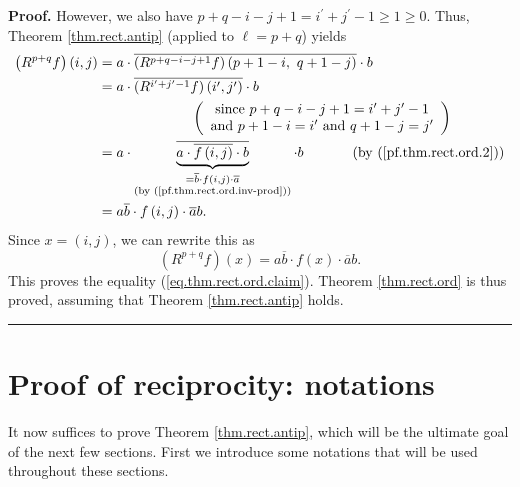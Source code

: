 \documentclass[numbers=enddot,12pt,final,onecolumn,notitlepage]{scrartcl}%
\theoremstyle{definition}
\newenvironment{verlong}{}{}
\newenvironment{proof}[1][Proof]{\noindent\textbf{#1.} }{\ \rule{0.5em}{0.5em}}
\begin{document}
\begin{verlong}
\begin{proof}
However, we also have $p+q-i-j+1=i^{\prime}+j^{\prime}-1\geq1\geq0$. Thus,
Theorem \ref{thm.rect.antip} (applied to $\ell=p+q$) yields%
\begin{align*}
\left(  R^{p+q}f\right)  \left(  i,j\right)   &  =a\cdot\overline{\left(
R^{p+q-i-j+1}f\right)  \left(  p+1-i,\ q+1-j\right)  }\cdot b\\
&  =a\cdot\overline{\left(  R^{i^{\prime}+j^{\prime}-1}f\right)  \left(
i^{\prime},j^{\prime}\right)  }\cdot b\\
&  \ \ \ \ \ \ \ \ \ \ \ \ \ \ \ \ \ \ \ \ \left(
\begin{array}
[c]{c}%
\text{since }p+q-i-j+1=i^{\prime}+j^{\prime}-1\\
\text{and }p+1-i=i^{\prime}\text{ and }q+1-j=j^{\prime}%
\end{array}
\right) \\
&  =a\cdot\underbrace{\overline{a\cdot\overline{f\left(  i,j\right)  }\cdot
b}}_{\substack{=\overline{b}\cdot f\left(  i,j\right)  \cdot\overline
{a}\\\text{(by (\ref{pf.thm.rect.ord.inv-prod}))}}}\cdot
b\ \ \ \ \ \ \ \ \ \ \left(  \text{by (\ref{pf.thm.rect.ord.2})}\right) \\
&  =a\overline{b}\cdot f\left(  i,j\right)  \cdot\overline{a}b.
\end{align*}
Since $x=\left(  i,j\right)  $, we can rewrite this as%
\[
\left(  R^{p+q}f\right)  \left(  x\right)  =a\overline{b}\cdot f\left(
x\right)  \cdot\overline{a}b.
\]
This proves the equality (\ref{eq.thm.rect.ord.claim}). Theorem
\ref{thm.rect.ord} is thus proved, assuming that Theorem \ref{thm.rect.antip} holds.
\end{proof}
\end{verlong}



\section{\label{sec.proof-nots}Proof of reciprocity: notations}

It now suffices to prove Theorem \ref{thm.rect.antip}, which will be the
ultimate goal of the next few sections. First we introduce some notations that
will be used throughout these sections.

\end{document}
